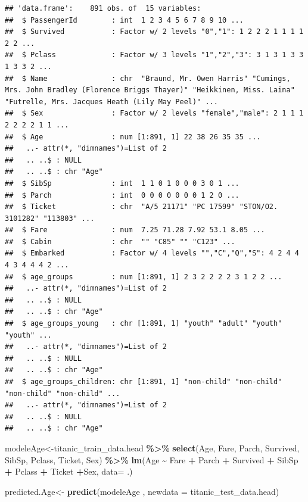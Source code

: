 \documentclass[
]{article}
\newenvironment{Shaded}{\begin{snugshade}}{\end{snugshade}}
\newcommand{\AttributeTok}[1]{\textcolor[rgb]{0.13,0.29,0.53}{#1}}
\newcommand{\FunctionTok}[1]{\textcolor[rgb]{0.13,0.29,0.53}{\textbf{#1}}}
\newcommand{\NormalTok}[1]{#1}
\newcommand{\OtherTok}[1]{\textcolor[rgb]{0.56,0.35,0.01}{#1}}
\newcommand{\SpecialCharTok}[1]{\textcolor[rgb]{0.81,0.36,0.00}{\textbf{#1}}}
\begin{document}
\begin{verbatim}
## 'data.frame':    891 obs. of  15 variables:
##  $ PassengerId        : int  1 2 3 4 5 6 7 8 9 10 ...
##  $ Survived           : Factor w/ 2 levels "0","1": 1 2 2 2 1 1 1 1 2 2 ...
##  $ Pclass             : Factor w/ 3 levels "1","2","3": 3 1 3 1 3 3 1 3 3 2 ...
##  $ Name               : chr  "Braund, Mr. Owen Harris" "Cumings, Mrs. John Bradley (Florence Briggs Thayer)" "Heikkinen, Miss. Laina" "Futrelle, Mrs. Jacques Heath (Lily May Peel)" ...
##  $ Sex                : Factor w/ 2 levels "female","male": 2 1 1 1 2 2 2 2 1 1 ...
##  $ Age                : num [1:891, 1] 22 38 26 35 35 ...
##   ..- attr(*, "dimnames")=List of 2
##   .. ..$ : NULL
##   .. ..$ : chr "Age"
##  $ SibSp              : int  1 1 0 1 0 0 0 3 0 1 ...
##  $ Parch              : int  0 0 0 0 0 0 0 1 2 0 ...
##  $ Ticket             : chr  "A/5 21171" "PC 17599" "STON/O2. 3101282" "113803" ...
##  $ Fare               : num  7.25 71.28 7.92 53.1 8.05 ...
##  $ Cabin              : chr  "" "C85" "" "C123" ...
##  $ Embarked           : Factor w/ 4 levels "","C","Q","S": 4 2 4 4 4 3 4 4 4 2 ...
##  $ age_groups         : num [1:891, 1] 2 3 2 2 2 2 3 1 2 2 ...
##   ..- attr(*, "dimnames")=List of 2
##   .. ..$ : NULL
##   .. ..$ : chr "Age"
##  $ age_groups_young   : chr [1:891, 1] "youth" "adult" "youth" "youth" ...
##   ..- attr(*, "dimnames")=List of 2
##   .. ..$ : NULL
##   .. ..$ : chr "Age"
##  $ age_groups_children: chr [1:891, 1] "non-child" "non-child" "non-child" "non-child" ...
##   ..- attr(*, "dimnames")=List of 2
##   .. ..$ : NULL
##   .. ..$ : chr "Age"
\end{verbatim}

\begin{Shaded}
\begin{Highlighting}[]
\NormalTok{modeleAge}\OtherTok{\textless{}{-}}\NormalTok{titanic\_train\_data.head }\SpecialCharTok{\%\textgreater{}\%}
  \FunctionTok{select}\NormalTok{(Age, Fare, Parch, Survived, SibSp, Pclass, Ticket, Sex) }\SpecialCharTok{\%\textgreater{}\%}
  \FunctionTok{lm}\NormalTok{(Age }\SpecialCharTok{\textasciitilde{}}\NormalTok{ Fare }\SpecialCharTok{+}\NormalTok{ Parch }\SpecialCharTok{+}\NormalTok{ Survived }\SpecialCharTok{+}\NormalTok{ SibSp }\SpecialCharTok{+}\NormalTok{ Pclass }\SpecialCharTok{+}\NormalTok{ Ticket }\SpecialCharTok{+}\NormalTok{Sex, }\AttributeTok{data=}\NormalTok{ .) }

\NormalTok{predicted.Age}\OtherTok{\textless{}{-}} \FunctionTok{predict}\NormalTok{(modeleAge , }\AttributeTok{newdata =}\NormalTok{  titanic\_test\_data.head) }
\end{Highlighting}
\end{Shaded}
\end{document}
